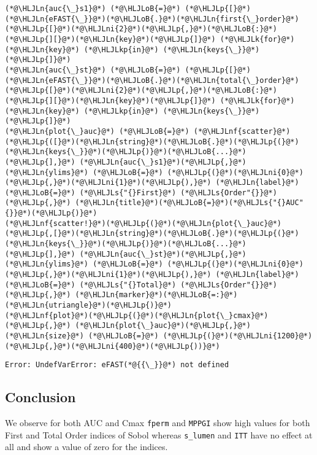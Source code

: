 \documentclass[12pt,a4paper]{article}
\newcommand{\HLJLk}[1]{\textcolor[RGB]{148,91,176}{\textbf{#1}}}
\newcommand{\HLJLkp}[1]{\textcolor[RGB]{148,91,176}{\textbf{#1}}}
\newcommand{\HLJLn}[1]{#1}
\newcommand{\HLJLnf}[1]{\textcolor[RGB]{66,102,213}{#1}}
\newcommand{\HLJLs}[1]{\textcolor[RGB]{201,61,57}{#1}}
\newcommand{\HLJLni}[1]{\textcolor[RGB]{59,151,46}{#1}}
\newcommand{\HLJLoB}[1]{\textcolor[RGB]{102,102,102}{\textbf{#1}}}
\newcommand{\HLJLp}[1]{#1}
\begin{document}
\begin{lstlisting}
(*@\HLJLn{auc{\_}s1}@*) (*@\HLJLoB{=}@*) (*@\HLJLp{[}@*)(*@\HLJLn{eFAST{\_}}@*)(*@\HLJLoB{.}@*)(*@\HLJLn{first{\_}order}@*)(*@\HLJLp{[}@*)(*@\HLJLni{2}@*)(*@\HLJLp{,}@*)(*@\HLJLoB{:}@*)(*@\HLJLp{][}@*)(*@\HLJLn{key}@*)(*@\HLJLp{]}@*) (*@\HLJLk{for}@*) (*@\HLJLn{key}@*) (*@\HLJLkp{in}@*) (*@\HLJLn{keys{\_}}@*)(*@\HLJLp{]}@*)
(*@\HLJLn{auc{\_}st}@*) (*@\HLJLoB{=}@*) (*@\HLJLp{[}@*)(*@\HLJLn{eFAST{\_}}@*)(*@\HLJLoB{.}@*)(*@\HLJLn{total{\_}order}@*)(*@\HLJLp{[}@*)(*@\HLJLni{2}@*)(*@\HLJLp{,}@*)(*@\HLJLoB{:}@*)(*@\HLJLp{][}@*)(*@\HLJLn{key}@*)(*@\HLJLp{]}@*) (*@\HLJLk{for}@*) (*@\HLJLn{key}@*) (*@\HLJLkp{in}@*) (*@\HLJLn{keys{\_}}@*)(*@\HLJLp{]}@*)
(*@\HLJLn{plot{\_}auc}@*) (*@\HLJLoB{=}@*) (*@\HLJLnf{scatter}@*)(*@\HLJLp{([}@*)(*@\HLJLn{string}@*)(*@\HLJLoB{.}@*)(*@\HLJLp{(}@*)(*@\HLJLn{keys{\_}}@*)(*@\HLJLp{)}@*)(*@\HLJLoB{...}@*)(*@\HLJLp{],}@*) (*@\HLJLn{auc{\_}s1}@*)(*@\HLJLp{,}@*) (*@\HLJLn{ylims}@*) (*@\HLJLoB{=}@*) (*@\HLJLp{(}@*)(*@\HLJLni{0}@*)(*@\HLJLp{,}@*)(*@\HLJLni{1}@*)(*@\HLJLp{),}@*) (*@\HLJLn{label}@*) (*@\HLJLoB{=}@*) (*@\HLJLs{"{}First}@*) (*@\HLJLs{Order"{}}@*)(*@\HLJLp{,}@*) (*@\HLJLn{title}@*)(*@\HLJLoB{=}@*)(*@\HLJLs{"{}AUC"{}}@*)(*@\HLJLp{)}@*)
(*@\HLJLnf{scatter!}@*)(*@\HLJLp{(}@*)(*@\HLJLn{plot{\_}auc}@*)(*@\HLJLp{,[}@*)(*@\HLJLn{string}@*)(*@\HLJLoB{.}@*)(*@\HLJLp{(}@*)(*@\HLJLn{keys{\_}}@*)(*@\HLJLp{)}@*)(*@\HLJLoB{...}@*)(*@\HLJLp{],}@*) (*@\HLJLn{auc{\_}st}@*)(*@\HLJLp{,}@*) (*@\HLJLn{ylims}@*) (*@\HLJLoB{=}@*) (*@\HLJLp{(}@*)(*@\HLJLni{0}@*)(*@\HLJLp{,}@*)(*@\HLJLni{1}@*)(*@\HLJLp{),}@*) (*@\HLJLn{label}@*) (*@\HLJLoB{=}@*) (*@\HLJLs{"{}Total}@*) (*@\HLJLs{Order"{}}@*)(*@\HLJLp{,}@*) (*@\HLJLn{marker}@*)(*@\HLJLoB{=:}@*)(*@\HLJLn{utriangle}@*)(*@\HLJLp{)}@*)
(*@\HLJLnf{plot}@*)(*@\HLJLp{(}@*)(*@\HLJLn{plot{\_}cmax}@*)(*@\HLJLp{,}@*) (*@\HLJLn{plot{\_}auc}@*)(*@\HLJLp{,}@*) (*@\HLJLn{size}@*) (*@\HLJLoB{=}@*) (*@\HLJLp{(}@*)(*@\HLJLni{1200}@*)(*@\HLJLp{,}@*)(*@\HLJLni{400}@*)(*@\HLJLp{))}@*)
\end{lstlisting}

\begin{lstlisting}
Error: UndefVarError: eFAST(*@{{\_}}@*) not defined
\end{lstlisting}


\subsection{Conclusion}
We observe for both AUC and Cmax \texttt{fperm} and \texttt{MPPGI} show high values for both First and Total Order indices of Sobol whereas \texttt{s\_lumen} and \texttt{ITT} have no effect at all and show a value of zero for the indices.
\end{document}
